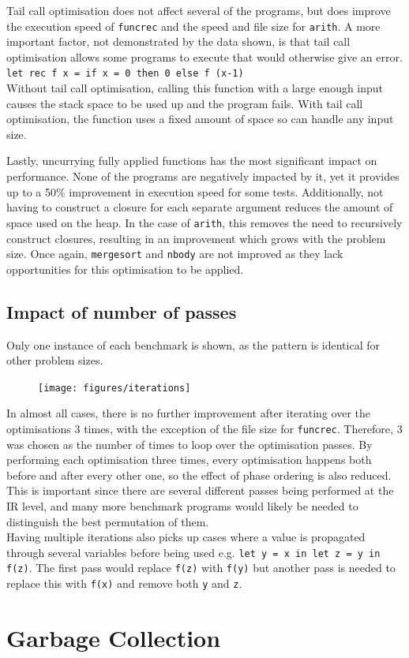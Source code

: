 Tail call optimisation does not affect several of the programs, but does improve the execution speed of \verb|funcrec| and the speed and file size for \verb|arith|. A more important factor, not demonstrated by the data shown, is that tail call optimisation allows some programs to execute that would otherwise give an error. \\
\verb|let rec f x = if x = 0 then 0 else f (x-1)| \\
Without tail call optimisation, calling this function with a large enough input causes the stack space to be used up and the program fails. With tail call optimisation, the function uses a fixed amount of space so can handle any input size.

Lastly, uncurrying fully applied functions has the most significant impact on performance. None of the programs are negatively impacted by it, yet it provides up to a 50\% improvement in execution speed for some tests. Additionally, not having to construct a closure for each separate argument reduces the amount of space used on the heap. In the case of \verb|arith|, this removes the need to recursively construct closures, resulting in an improvement which grows with the problem size. Once again, \verb|mergesort| and \verb|nbody| are not improved as they lack opportunities for this optimisation to be applied.


\subsection{Impact of number of passes}
Only one instance of each benchmark is shown, as the pattern is identical for other problem sizes.

\begin{figure}[H]
\hspace{-1cm}
\texttt{[image: figures/iterations]}
 \label{fig:iterations} 
\end{figure}

In almost all cases, there is no further improvement after iterating over the optimisations 3 times, with the exception of the file size for \verb|funcrec|. Therefore, 3 was chosen as the number of times to loop over the optimisation passes. By performing each optimisation three times, every optimisation happens both before and after every other one, so the effect of phase ordering is also reduced. This is important since there are several different passes being performed at the IR level, and many more benchmark programs would likely be needed to distinguish the best permutation of them.\\
Having multiple iterations also picks up cases where a value is propagated through several variables before being used e.g. \verb|let y = x in let z = y in f(z)|. The first pass would replace \verb|f(z)| with \verb|f(y)| but another pass is needed to replace this with \verb|f(x)| and remove both \verb|y| and \verb|z|.


\section{Garbage Collection}










